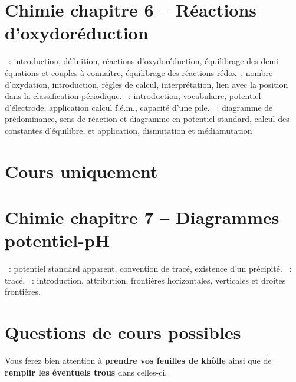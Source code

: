 \documentclass[a4paper, 12pt, final, garamond]{book}
\begin{document}
\section*{Chimie chapitre 6 -- Réactions d'oxydoréduction}
\begin{enumerate}[label=\Roman*]
    ~: introduction, définition, réactions
        d'oxydoréduction, équilibrage des demi-équations et couples à connaître,
        équilibrage des réactions rédox~; nombre d'oxydation, introduction,
        règles de calcul, interprétation, lien avec la position dans la
        classification périodique.
    ~: introduction, vocabulaire, potentiel d'électrode, application
        calcul f.é.m., capacité d'une pile.
    ~: diagramme de prédominance, sens de
        réaction et diagramme en potentiel standard, calcul des constantes
        d'équilibre, et application, dismutation et médiamutation
\end{enumerate}

\section{Cours uniquement}
\section*{Chimie chapitre 7 -- Diagrammes potentiel-pH}
\begin{enumerate}[label=\Roman*]
    ~: potentiel standard apparent,
    convention de tracé, existence d'un précipité.
    ~: tracé.
    ~: introduction, attribution, frontières
    horizontales, verticales et droites frontières.
\end{enumerate}

\section{Questions de cours possibles}
\begin{center}
    \begin{framed}
      \huge
        Vous ferez bien attention à \textbf{prendre vos feuilles de khôlle}
        ainsi que de \textbf{remplir les éventuels trous} dans celles-ci.
    \end{framed}
\end{center}
\end{document}
